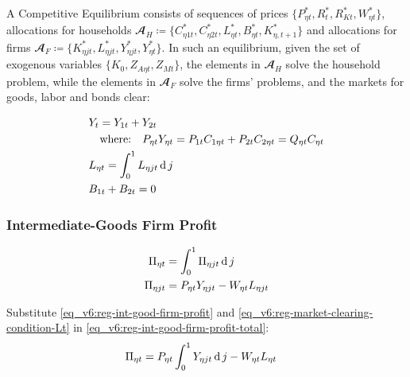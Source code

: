 \documentclass[../thesis.tex]{subfiles}
\begin{document}
	A Competitive Equilibrium consists of sequences of prices $\{P_{\eta t}^{\ast}, R_t^{\ast}, R_{Kt}^{\ast}, W_{\eta t}^{\ast}\}$, allocations for households $\mathbfscr{A}_H \coloneq \{C_{\eta 1 t}^{\ast}, C_{\eta 2 t}^{\ast}, L_{\eta t}^{\ast}, B_{\eta t}^{\ast}, K_{\eta, t+1}^{\ast}\}$ and allocations  for firms $\mathbfscr{A}_F \coloneq \{K_{\eta jt}^{\ast}, L_{\eta jt}^{\ast}, Y_{\eta jt}^{\ast}, Y_{\eta t}^{\ast}\}$. In such an equilibrium, given the set of exogenous variables $\{K_0, Z_{A\eta t}, Z_{Mt}\}$, the elements in $\mathbfscr{A}_H$ solve the household problem, while the elements in $\mathbfscr{A}_F$ solve the firms' problems, and the markets for goods, labor and bonds clear:
	\begin{tcolorbox}[colback=red!5!white,colframe=red!75!black]
	\begin{align}
		& Y_{t} = Y_{1 t} + Y_{2 t} \label{eq_v6:reg-market-clearing-condition-Yt} \\
		& \quad \text{where:} \quad P_{\eta t} Y_{\eta t} = P_{1t} C_{1 \eta t} + P_{2t} C_{2 \eta t} = Q_{\eta t} C_{\eta t} \label{eq_v6:reg-regional-demand} \\
		& L_{\eta t} = \int_{0}^{1} L_{\eta jt} \operatorname{d} j \label{eq_v6:reg-market-clearing-condition-Lt} \\
		& B_{1t} + B_{2t} = 0 \label{eq_v6:reg-market-clearing-condition-Bt}
	\end{align}
	\end{tcolorbox}


\subsubsection*{Intermediate-Goods Firm Profit}

\begin{align}
	\Pi_{\eta t} &= \int_{0}^{1} \Pi_{\eta jt} \operatorname{d} j \label{eq_v6:reg-int-good-firm-profit-total} \\
	\Pi_{\eta jt} &= P_{\eta t} Y_{\eta jt} - W_{\eta t} L_{\eta jt} \label{eq_v6:reg-int-good-firm-profit}
\end{align}

Substitute \ref{eq_v6:reg-int-good-firm-profit} and \ref{eq_v6:reg-market-clearing-condition-Lt} in \ref{eq_v6:reg-int-good-firm-profit-total}:
\begin{align}
	\Pi_{\eta t} &= P_{\eta t} \int_{0}^{1} Y_{\eta jt} \operatorname{d} j - W_{\eta t} L_{\eta t} \label{eq_v6:reg-int-good-firm-profit-total-2}
\end{align}
\end{document}
